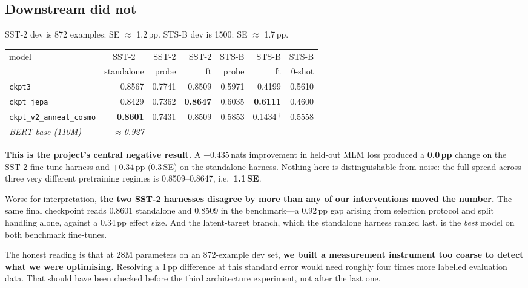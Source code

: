 \documentclass[11pt,a4paper]{article}
\newcommand{\nats}[1]{\ensuremath{#1}\,nats}
\begin{document}
\subsection{Downstream did not}

SST-2 dev is 872 examples: SE $\approx$ 1.2\,pp. STS-B dev is 1500: SE $\approx$ 1.7\,pp.

\begin{table}[H]
\centering\footnotesize\setlength{\tabcolsep}{5pt}
\begin{tabular}{lrrrrrr}
\toprule
model & \multicolumn{1}{c}{SST-2} & SST-2 & SST-2 & STS-B & STS-B & STS-B \\
      & \multicolumn{1}{c}{standalone} & probe & ft & probe & ft & 0-shot \\
\midrule
\texttt{ckpt3}                    & 0.8567 & 0.7741 & 0.8509 & 0.5971 & 0.4199 & 0.5610 \\
\texttt{ckpt\_jepa}               & 0.8429 & 0.7362 & \textbf{0.8647} & 0.6035 & \textbf{0.6111} & 0.4600 \\
\texttt{ckpt\_v2\_anneal\_cosmo}  & \textbf{0.8601} & 0.7431 & 0.8509 & 0.5853 & 0.1434\,$^\dagger$ & 0.5558 \\
\emph{BERT-base (110M)}           & \emph{$\approx$0.927} & & & & & \\
\bottomrule
\end{tabular}
\end{table}

\noindent
\textbf{This is the project's central negative result.} A \nats{-0.435} improvement in held-out
MLM loss produced a \textbf{0.0\,pp} change on the SST-2 fine-tune harness and $+0.34$\,pp
(0.3\,SE) on the standalone harness. Nothing here is distinguishable from noise: the full
spread across three very different pretraining regimes is 0.8509--0.8647, i.e.\ \textbf{1.1\,SE}.

Worse for interpretation, \textbf{the two SST-2 harnesses disagree by more than any of our
interventions moved the number.} The same final checkpoint reads 0.8601 standalone and 0.8509
in the benchmark---a 0.92\,pp gap arising from selection protocol and split handling alone,
against a 0.34\,pp effect size. And the latent-target branch, which the standalone harness
ranked last, is the \emph{best} model on both benchmark fine-tunes.

The honest reading is that at 28M parameters on an 872-example dev set, \textbf{we built a
measurement instrument too coarse to detect what we were optimising.} Resolving a 1\,pp
difference at this standard error would need roughly four times more labelled evaluation data.
That should have been checked before the third architecture experiment, not after the last one.
\end{document}
